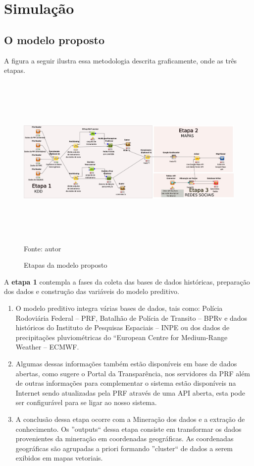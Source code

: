 \chapter{Simulação}\label{simula}

\section{O modelo proposto}

A figura a seguir ilustra essa metodologia descrita graficamente, onde as três etapas.

\pagebreak

\begin{figure}[ht]
\centering
\caption{Etapas da modelo proposto}
\includegraphics[width=170mm, height=85mm]{Figuras/Cronograma/metodologia.png}\\
\tiny Fonte: autor
\end{figure}

A \textbf{etapa 1} contempla a fases da coleta das bases de dados históricas, preparação dos dados e construção das variáveis do modelo preditivo.
  \begin{enumerate}
    \item O modelo preditivo integra várias bases de dados, tais como: Polícia Rodoviária Federal -- PRF, Batalhão de Polícia de Transito -- BPRv e dados históricos 
	   do Instituto de Pesquisas Espaciais -- INPE ou dos dados de precipitações pluviométricas do ``European Centre for Medium-Range Weather -- ECMWF.
 
    \item Algumas dessas informações também estão disponíveis em base de dados abertas, como sugere o Portal da Transparência, nos servidores da PRF além de outras
	  informações para complementar o sistema estão disponíveis na Internet sendo atualizadas pela PRF através de uma API aberta, esta pode 
	  ser configurável para se ligar ao nosso sistema.
    \item A conclusão dessa etapa ocorre com a Mineração dos dados e a extração de conhecimento.
	  Os ''outputs`` dessa etapa consiste em transformar os dados provenientes da mineração em coordenadas geográficas. 
	  As coordenadas geográficas são agrupadas a priori formando ''cluster`` de dados a serem exibidos em mapas vetoriais.\\
\end{enumerate}
  
